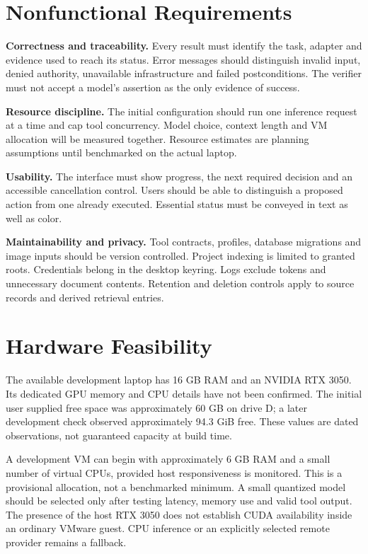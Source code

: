 \section{Nonfunctional Requirements}
\textbf{Correctness and traceability.} Every result must identify the task, adapter and evidence used to reach its status. Error messages should distinguish invalid input, denied authority, unavailable infrastructure and failed postconditions. The verifier must not accept a model's assertion as the only evidence of success.

\textbf{Resource discipline.} The initial configuration should run one inference request at a time and cap tool concurrency. Model choice, context length and VM allocation will be measured together. Resource estimates are planning assumptions until benchmarked on the actual laptop.

\textbf{Usability.} The interface must show progress, the next required decision and an accessible cancellation control. Users should be able to distinguish a proposed action from one already executed. Essential status must be conveyed in text as well as color.

\textbf{Maintainability and privacy.} Tool contracts, profiles, database migrations and image inputs should be version controlled. Project indexing is limited to granted roots. Credentials belong in the desktop keyring. Logs exclude tokens and unnecessary document contents. Retention and deletion controls apply to source records and derived retrieval entries.

\section{Hardware Feasibility}
The available development laptop has 16 GB RAM and an NVIDIA RTX 3050. Its dedicated GPU memory and CPU details have not been confirmed. The initial user supplied free space was approximately 60 GB on drive D; a later development check observed approximately 94.3 GiB free. These values are dated observations, not guaranteed capacity at build time.

A development VM can begin with approximately 6 GB RAM and a small number of virtual CPUs, provided host responsiveness is monitored. This is a provisional allocation, not a benchmarked minimum. A small quantized model should be selected only after testing latency, memory use and valid tool output. The presence of the host RTX 3050 does not establish CUDA availability inside an ordinary VMware guest. CPU inference or an explicitly selected remote provider remains a fallback.

